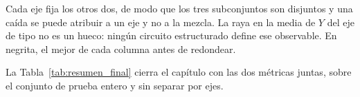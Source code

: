 \begin{table}[htbp]
    {\footnotesize Cada eje fija los otros dos, de modo que los
    tres subconjuntos son disjuntos y una caída se puede atribuir a un eje y no a la mezcla. La raya en la media de $Y$ del eje de
    tipo no es un hueco: ningún circuito estructurado define ese observable. En negrita, el
    mejor de cada columna antes de redondear.}
\end{table}

La Tabla~\ref{tab:resumen_final} cierra el capítulo con las dos métricas juntas, sobre el
conjunto de prueba entero y sin separar por ejes.

%
%
%
%


